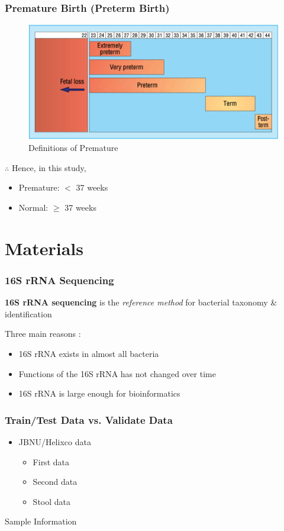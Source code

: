 \documentclass{beamer}
\begin{document}
    \begin{frame}
        \frametitle{Premature Birth (Preterm Birth)}

        \begin{figure}
            \includegraphics[width=0.6 \linewidth]{figures/premature.png}
            \caption{Definitions of Premature \protect\cite{premature1}}
        \end{figure}

        $\therefore$ Hence, in this study,
        \begin{itemize}
            \item Premature: $<$ 37 weeks
            \item Normal: $\ge$ 37 weeks
        \end{itemize}
    \end{frame}

    \section{Materials}
    \begin{frame}
        \frametitle{16S rRNA Sequencing}

        \textbf{16S rRNA sequencing} is the \textit{reference method} for bacterial taxonomy \& identification \cite{16S1}

        Three main reasons \cite{16S2}:
        \begin{itemize}
            \item 16S rRNA exists in almost all bacteria
            \item Functions of the 16S rRNA has not changed over time
            \item 16S rRNA is large enough for bioinformatics
        \end{itemize}
    \end{frame}

    \begin{frame}
        \frametitle{Train/Test Data vs. Validate Data}
        \begin{itemize}
            \item JBNU/Helixco data
            \begin{itemize}
                \item First data
                \item Second data
                \item Stool data
            \end{itemize}
        \end{itemize}

        \begin{table}
            \centering
            \caption{Sample Information}
            
        \end{table}
    \end{frame}
\end{document}
